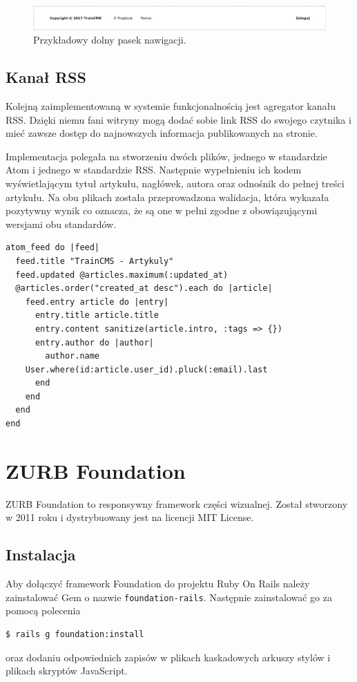 \documentclass[openright]{xmgr}
\begin{document}
\begin{figure}[!tbh]
\centering
\includegraphics[width=\linewidth]{fig/footbar}
\caption{Przykładowy dolny pasek nawigacji.}
\end{figure}

\newpage

\subsection{Kanał RSS}
Kolejną zaimplementowaną w systemie funkcjonalnością jest agregator kanału RSS. Dzięki niemu fani witryny mogą dodać sobie link RSS do swojego czytnika i mieć zawsze dostęp do najnowszych informacja publikowanych na stronie.

Implementacja polegała na stworzeniu dwóch plików, jednego w standardzie Atom i jednego w standardzie RSS. Następnie wypełnieniu ich kodem wyświetlającym tytuł artykułu, nagłówek, autora oraz odnośnik do pełnej treści artykułu. Na obu plikach została przeprowadzona walidacja, która wykazała pozytywny wynik co oznacza, że są one w pełni zgodne z obowiązującymi wersjami obu standardów.

\begin{lstlisting}[language=ruby2, caption={Kod generatora spływu wiadomości w standardzie Atom}]
atom_feed do |feed|
  feed.title "TrainCMS - Artykuly"
  feed.updated @articles.maximum(:updated_at)
  @articles.order("created_at desc").each do |article|
    feed.entry article do |entry|
      entry.title article.title
      entry.content sanitize(article.intro, :tags => {})
      entry.author do |author|
        author.name
	User.where(id:article.user_id).pluck(:email).last
      end
    end
  end
end
\end{lstlisting}

\newpage

\section{ZURB Foundation}
ZURB Foundation \cite{foundation} to responsywny framework części wizualnej. Został stworzony w 2011 roku i dystrybuowany jest na licencji MIT License.

\subsection{Instalacja}
Aby dołączyć framework Foundation do projektu Ruby On Rails należy zainstalować Gem o nazwie \texttt{foundation-rails}. Następnie zainstalować go za pomocą polecenia
\begin{lstlisting}[language=html, caption={Kod instalujący Foundation w naszym projekcie}]
$ rails g foundation:install
\end{lstlisting}
oraz dodaniu odpowiednich zapisów w plikach kaskadowych arkuszy stylów i plikach skryptów JavaScript.
\end{document}
